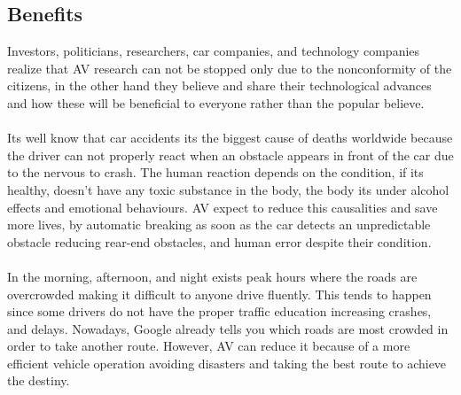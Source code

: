    \subsection{Benefits}
    Investors, politicians, researchers, car companies, and technology companies realize that AV research can not be stopped only due to the nonconformity of the citizens, in the other hand they believe and share their technological advances and how these will be beneficial to everyone rather than the popular believe.\\
    \\Its well know that car accidents its the biggest cause of deaths worldwide because the driver can not properly react when an obstacle appears in front of the car due to the nervous to crash. The human reaction depends on the condition, if its healthy, doesn't have any toxic substance in the body, the body its under alcohol effects and emotional behaviours. AV expect to reduce this causalities and save more lives, by automatic breaking as soon as the car detects an unpredictable obstacle reducing rear-end obstacles, and human error despite their condition.\\
    \\In the morning, afternoon, and night exists peak hours where the roads are overcrowded making it difficult to anyone drive fluently. This tends to happen since some drivers do not have the proper traffic education increasing crashes, and delays. Nowadays, Google already tells you which roads are most crowded in order to take another route. However, AV can reduce it because of a more efficient vehicle operation avoiding disasters and taking the best route to achieve the destiny.
    
